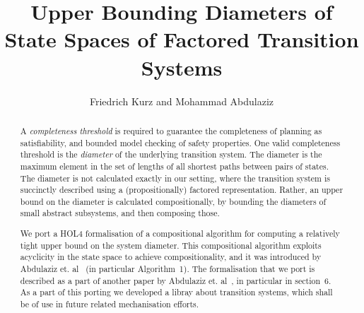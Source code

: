 \documentclass[11pt,a4paper]{article}
\begin{document}
\title{Upper Bounding Diameters of State Spaces of Factored Transition Systems}
\author{Friedrich Kurz and Mohammad Abdulaziz}
\maketitle

\begin{abstract}
A {\em completeness threshold} is required to guarantee the completeness of planning as satisfiability, and bounded model checking of safety properties.
One valid completeness threshold is the {\em diameter} of the underlying transition system.
The diameter is the maximum element in the set of lengths of all shortest paths between pairs of states.
The diameter is not calculated exactly in our setting, where the transition system is succinctly described using a (propositionally) factored representation.
Rather, an upper bound on the diameter is calculated compositionally, by bounding the diameters of small abstract subsystems, and then composing those.

We port a HOL4 formalisation of a compositional algorithm for computing a relatively tight upper bound on the system diameter.
This compositional algorithm exploits acyclicity in the state space to achieve compositionality, and it was introduced by Abdulaziz et. al~\cite{icaps2017} (in particular Algorithm~1).
The formalisation that we port is described as a part of another paper by Abdulaziz et. al~\cite{abdulaziz2018formally}, in particular in section~6.
As a part of this porting we developed a libray about transition systems, which shall be of use in future related mechanisation efforts.
\end{abstract}

\tableofcontents





\end{document}
